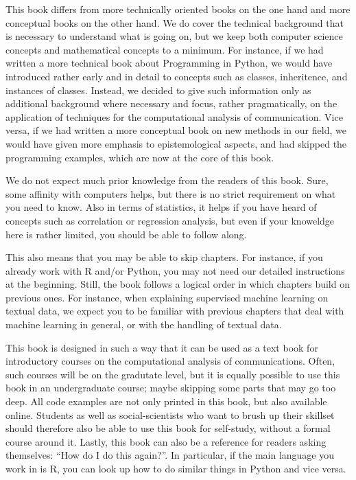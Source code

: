 This book differs from more technically oriented books on the one hand
and more conceptual books on the other hand. We do cover the technical
background that is necessary to understand what is going on, but we
keep both computer science concepts and mathematical concepts to a
minimum. For instance, if we had written a more technical book about
Programming in Python, we would have introduced rather early and in
detail to concepts such as classes, inheritence, and instances of
classes. Instead, we decided to give such information only as
additional background where necessary and focus, rather pragmatically,
on the application of techniques for the computational analysis of
communication. Vice versa, if we had written a more conceptual book on
new methods in our field, we would have given more emphasis to
epistemological aspects, and had skipped the programming examples,
which are now at the core of this book.

We do not expect much prior knowledge from the readers of this
book. Sure, some affinity with computers helps, but there is no strict
requirement on what you need to know. Also in terms of statistics, it
helps if you have heard of concepts such as correlation or
regression analysis, but even if your knoweldge here is rather
limited, you should be able to follow along.

This also means that you may be able to skip chapters. For instance,
if you already work with R and/or Python, you may not need our
detailed instructions at the beginning. Still, the book follows a
logical order in which chapters build on previous ones. For instance,
when explaining supervised machine learning on textual data, we expect
you to be familiar with previous chapters that deal with machine
learning in general, or with the handling of textual data.

This book is designed in such a way that it can be used as a text book
for introductory courses on the computational analysis of
communications. Often, such courses will be on the gradutate level,
but it is equally possible to use this book in an undergraduate
course; maybe skipping some parts that may go too deep. All code
examples are not only printed in this book, but also available
online. Students as well as social-scientists who want to brush up
their skillset should therefore also be able to use this book for
self-study, without a formal course around it. Lastly, this book can
also be a reference for readers asking themselves: ``How do I 
do this again?''. In particular, if the main language you work in is
R, you can look up how to do similar things in Python and vice versa.

